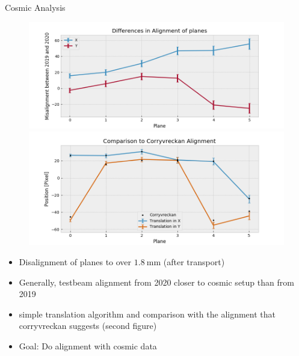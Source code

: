 \documentclass{beamer}
\begin{document}
\begin{frame}{Cosmic Analysis}
    \footnotesize
    \begin{minipage}{.6\textwidth}
    \begin{figure}[H]
	\centering
	\includegraphics[trim=30 0 50 0, clip, width=\textwidth]{Misalignment.png}\\
	\includegraphics[trim=30 0 50 0, clip, width=\textwidth]{Corry.png}
    \end{figure}
    \end{minipage}
    \begin{minipage}{.39\textwidth}
	\begin{itemize}
	    \item Disalignment of planes to over \( 1.8 \ \si{\milli \meter} \)
		(after transport)
	    \item Generally, testbeam alignment from 2020 closer to cosmic
		setup than from 2019
	    \item simple translation algorithm and comparison with the alignment
		that corryvreckan suggests (second figure)
	    \item Goal: Do alignment with cosmic data
	\end{itemize}
    \end{minipage}
\end{frame}
\end{document}
